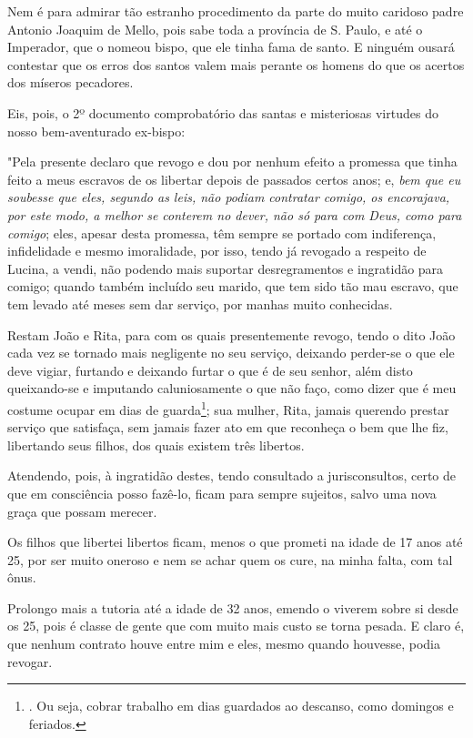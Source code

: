 Nem é para admirar tão estranho procedimento da parte do muito caridoso
padre Antonio Joaquim de Mello, pois sabe toda a província de S. Paulo,
e até o Imperador, que o nomeou bispo, que ele tinha fama de santo. E
ninguém ousará contestar que os erros dos santos valem mais perante os
homens do que os acertos dos míseros pecadores.

Eis, pois, o 2º documento comprobatório das santas e misteriosas
virtudes do nosso bem-aventurado ex-bispo:

"Pela presente declaro que revogo e dou por nenhum efeito a promessa que
tinha feito a meus escravos de os libertar depois de passados certos
anos; e, \emph{bem que eu soubesse que eles, segundo as leis, não podiam
contratar comigo, os encorajava, por este modo, a melhor se conterem no
dever, não só para com Deus, como para comigo}; eles, apesar desta
promessa, têm sempre se portado com indiferença, infidelidade e mesmo
imoralidade, por isso, tendo já revogado a respeito de Lucina, a vendi,
não podendo mais suportar desregramentos e ingratidão para comigo;
quando também incluído seu marido, que tem sido tão mau escravo, que tem
levado até meses sem dar serviço, por manhas muito conhecidas.

Restam João e Rita, para com os quais presentemente revogo, tendo o dito
João cada vez se tornado mais negligente no seu serviço, deixando
perder-se o que ele deve vigiar, furtando e deixando furtar o que é de
seu senhor, além disto queixando-se e imputando caluniosamente o que não
faço, como dizer que é meu costume ocupar em dias de guarda\footnote{.
  Ou seja, cobrar trabalho em dias guardados ao descanso, como domingos
  e feriados.}; sua mulher, Rita, jamais querendo prestar serviço que
satisfaça, sem jamais fazer ato em que reconheça o bem que lhe fiz,
libertando seus filhos, dos quais existem três libertos.

Atendendo, pois, à ingratidão destes, tendo consultado a jurisconsultos,
certo de que em consciência posso fazê-lo, ficam para sempre sujeitos,
salvo uma nova graça que possam merecer.

Os filhos que libertei libertos ficam, menos o que prometi na idade de
17 anos até 25, por ser muito oneroso e nem se achar quem os cure, na
minha falta, com tal ônus.

Prolongo mais a tutoria até a idade de 32 anos, emendo o viverem sobre
si desde os 25, pois é classe de gente que com muito mais custo se torna
pesada. E claro é, que nenhum contrato houve entre mim e eles, mesmo
quando houvesse, podia revogar.


